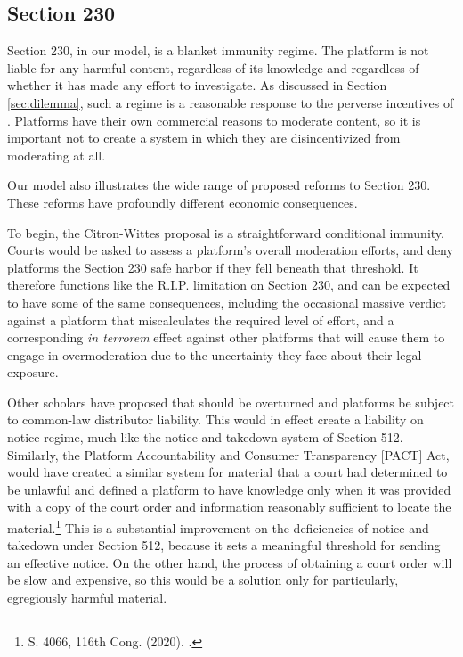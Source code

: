 \subsection{Section 230}

Section 230, in our model, is a blanket immunity regime. The platform is not liable for any harmful content, regardless of its knowledge and regardless of whether it has made any effort to investigate. As discussed in Section \ref{sec:dilemma}, such a regime is a reasonable response to the perverse incentives of . Platforms have their own commercial reasons to moderate content, so it is important not to create a system in which they are disincentivized from moderating at all.

Our model also illustrates the wide range of proposed reforms to Section 230. These reforms have profoundly different economic consequences.

To begin, the Citron-Wittes proposal is a straightforward conditional immunity. Courts would be asked to assess a platform's overall moderation efforts, and deny platforms the Section 230 safe harbor if they fell beneath that threshold. It therefore functions like the R.I.P. limitation on Section 230, and can be expected to have some of the same consequences, including the occasional massive verdict against a platform that miscalculates the required level of effort, and a corresponding \emph{in terrorem} effect against other platforms that will cause them to engage in overmoderation due to the uncertainty they face about their legal exposure.

Other scholars have proposed that  should be overturned and platforms be subject to common-law distributor liability. This would in effect create a liability on notice regime, much like the notice-and-takedown system of Section 512. Similarly, the Platform Accountability and Consumer Transparency [PACT] Act, would have created a similar system for material that a court had determined to be unlawful and defined a platform to have knowledge only when it was provided with a copy of the court order and information reasonably sufficient to locate the material.\footnote{S. 4066, 116th Cong. (2020). .} This is a substantial improvement on the deficiencies of notice-and-takedown under Section 512, because it sets a meaningful threshold for sending an effective notice. On the other hand, the process of obtaining a court order will be slow and expensive, so this would be a solution only for particularly, egregiously harmful material.



